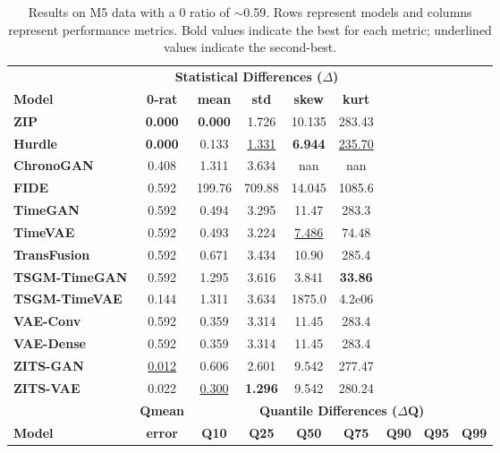 \documentclass[make,article,submit,moreauthors]{Definitions/mdpi}
\begin{document}
\begin{table}[htbp]
\centering
\caption{Results on M5 data with a 0 ratio of $\sim$0.59. Rows represent models and columns represent performance metrics. Bold values indicate the best for each metric; underlined values indicate the second-best.}
\label{tab:m5_results}
\setlength{\tabcolsep}{2.2pt} 
\renewcommand{\arraystretch}{1.0} 
\begin{tabular}{l cccccccc}
\toprule
& \multicolumn{5}{c}{\textbf{Statistical Differences ($\Delta$)}} & & & \\
\cmidrule(lr){2-6}
\textbf{Model} & \textbf{0-rat} & \textbf{mean} & \textbf{std} & \textbf{skew} & \textbf{kurt} & & & \\
\midrule
\textbf{ZIP}          & \textbf{0.000} & \textbf{0.000} & 1.726 & 10.135 & 283.43 & & & \\
\textbf{Hurdle}       & \textbf{0.000} & 0.133 & \underline{1.331} & \textbf{6.944} & \underline{235.70} & & & \\
\textbf{ChronoGAN}    & 0.408 & 1.311 & 3.634 & nan & nan & & & \\
\textbf{FIDE}         & 0.592 & 199.76 & 709.88 & 14.045 & 1085.6 & & & \\
\textbf{TimeGAN}      & 0.592 & 0.494 & 3.295 & 11.47 & 283.3 & & & \\
\textbf{TimeVAE}      & 0.592 & 0.493 & 3.224 & \underline{7.486} & 74.48 & & & \\
\textbf{TransFusion}  & 0.592 & 0.671 & 3.434 & 10.90 & 285.4 & & & \\
\textbf{TSGM-TimeGAN} & 0.592 & 1.295 & 3.616 & 3.841 & \textbf{33.86} & & & \\
\textbf{TSGM-TimeVAE} & 0.144 & 1.311 & 3.634 & 1875.0 & 4.2e06 & & & \\
\textbf{VAE-Conv}     & 0.592 & 0.359 & 3.314 & 11.45 & 283.4 & & & \\
\textbf{VAE-Dense}    & 0.592 & 0.359 & 3.314 & 11.45 & 283.4 & & & \\
\textbf{ZITS-GAN}     & \underline{0.012} & 0.606 & 2.601 & 9.542 & 277.47 & & & \\
\textbf{ZITS-VAE}     & 0.022 & \underline{0.300} & \textbf{1.296} & 9.542 & 280.24 & & & \\
\midrule
& \textbf{Qmean} & \multicolumn{7}{c}{\textbf{Quantile Differences ($\Delta$Q)}} \\
\cmidrule(lr){3-9}
\textbf{Model} & \textbf{error} & \textbf{Q10} & \textbf{Q25} & \textbf{Q50} & \textbf{Q75} & \textbf{Q90} & \textbf{Q95} & \textbf{Q99} \\

\end{tabular}
\end{table}
\end{document}
